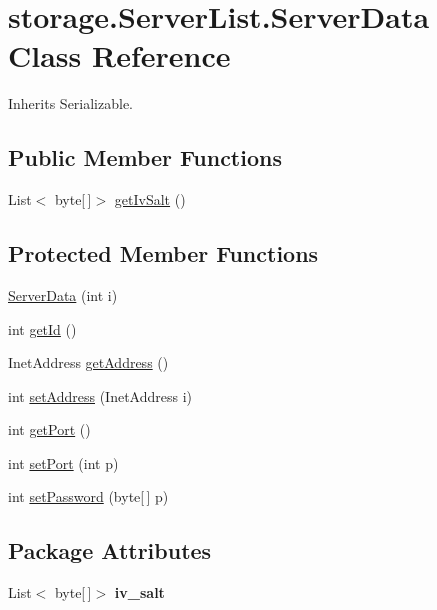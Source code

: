 \hypertarget{classstorage_1_1_server_list_1_1_server_data}{
\section{storage.\-Server\-List.\-Server\-Data \-Class \-Reference}
\label{classstorage_1_1_server_list_1_1_server_data}
}


\-Inherits \-Serializable.

\subsection*{\-Public \-Member \-Functions}
\begin{DoxyCompactItemize}
\item 
\-List$<$ byte\mbox{[}$\,$\mbox{]}$>$ \hyperlink{classstorage_1_1_server_list_1_1_server_data_a64da3ad03ae5bbc8d578730b199977f5}{get\-Iv\-Salt} ()
\end{DoxyCompactItemize}
\subsection*{\-Protected \-Member \-Functions}
\begin{DoxyCompactItemize}
\item 
\hyperlink{classstorage_1_1_server_list_1_1_server_data_aa5212e236c0b8624f15bc2c4bfed79a8}{\-Server\-Data} (int i)
\item 
int \hyperlink{classstorage_1_1_server_list_1_1_server_data_af02fef9b39073181c0a95402cde2c0aa}{get\-Id} ()
\item 
\-Inet\-Address \hyperlink{classstorage_1_1_server_list_1_1_server_data_a0fdb0c32ffd493afdd972426318eb4f8}{get\-Address} ()
\item 
int \hyperlink{classstorage_1_1_server_list_1_1_server_data_a0d545ec51b1ebaa1120bb0ca131049a7}{set\-Address} (\-Inet\-Address i)
\item 
int \hyperlink{classstorage_1_1_server_list_1_1_server_data_a24f282f4f9fa46b513e02dc6de98ed5e}{get\-Port} ()
\item 
int \hyperlink{classstorage_1_1_server_list_1_1_server_data_a64d011f6e3dfeaa6c692df4dfb2e9691}{set\-Port} (int p)
\item 
int \hyperlink{classstorage_1_1_server_list_1_1_server_data_a226702f161358acc3accb4a4cb08ee6b}{set\-Password} (byte\mbox{[}$\,$\mbox{]} p)
\end{DoxyCompactItemize}
\subsection*{\-Package \-Attributes}
\begin{DoxyCompactItemize}
\item 
\hypertarget{classstorage_1_1_server_list_1_1_server_data_a394b9a051190b85e3e397669079ace6e}{
\-List$<$ byte\mbox{[}$\,$\mbox{]}$>$ {\bfseries iv\-\_\-salt}}
\label{classstorage_1_1_server_list_1_1_server_data_a394b9a051190b85e3e397669079ace6e}

\end{DoxyCompactItemize}


